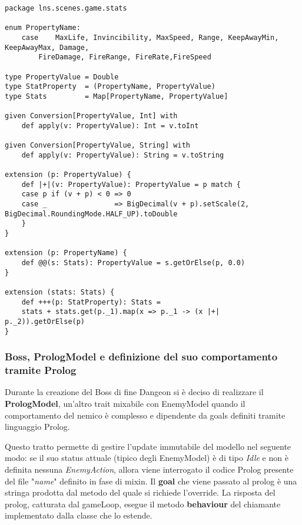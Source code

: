 \begin{lstlisting}[basicstyle=\tiny]
package lns.scenes.game.stats

enum PropertyName:
	case 	MaxLife, Invincibility, MaxSpeed, Range, KeepAwayMin, KeepAwayMax, Damage, 
		FireDamage, FireRange, FireRate,FireSpeed

type PropertyValue = Double
type StatProperty  = (PropertyName, PropertyValue)
type Stats         = Map[PropertyName, PropertyValue]

given Conversion[PropertyValue, Int] with
	def apply(v: PropertyValue): Int = v.toInt

given Conversion[PropertyValue, String] with
	def apply(v: PropertyValue): String = v.toString

extension (p: PropertyValue) {
	def |+|(v: PropertyValue): PropertyValue = p match {
	case p if (v + p) < 0 => 0
	case _                => BigDecimal(v + p).setScale(2, BigDecimal.RoundingMode.HALF_UP).toDouble
	}
}

extension (p: PropertyName) {
	def @@(s: Stats): PropertyValue = s.getOrElse(p, 0.0)
}

extension (stats: Stats) {
	def +++(p: StatProperty): Stats =
	stats + stats.get(p._1).map(x => p._1 -> (x |+| p._2)).getOrElse(p)
}
\end{lstlisting}

\subsubsection{Boss, PrologModel e definizione del suo comportamento tramite Prolog}
Durante la creazione del Boss di fine Dangeon si è deciso di realizzare il \textbf{PrologModel}, 
un'altro trait mixabile con EnemyModel quando il comportamento del nemico è complesso e dipendente da goals definiti tramite linguaggio Prolog.

Questo tratto permette di gestire l'update immutabile del modello nel seguente modo:
se il suo status attuale (tipico degli EnemyModel) è di tipo \textit{Idle} e non è definita nessuna \textit{EnemyAction}, 
allora viene interrogato il codice Prolog presente del file "\textit{name}" definito in fase di mixin.
Il \textbf{goal} che viene passato al prolog è una stringa prodotta dal metodo del quale si richiede l'override.
La risposta del prolog, catturata dal gameLoop, esegue il metodo \textbf{behaviour} del chiamante implementato dalla classe che lo estende. 

